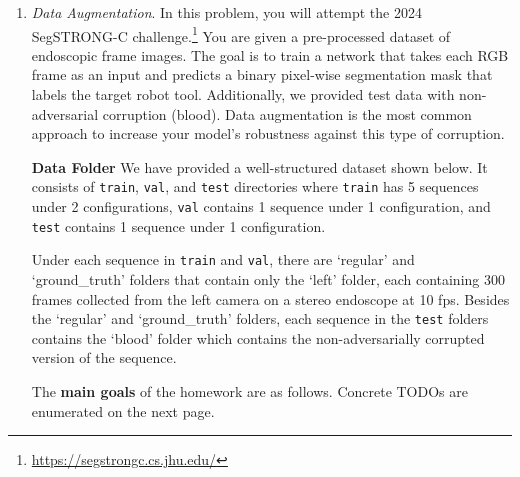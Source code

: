 \documentclass[a4paper]{article}
\begin{document}
	\begin{enumerate}
		\item \textit{Data Augmentation}. In this problem, you will attempt the 2024 SegSTRONG-C challenge.\footnote{\url{https://segstrongc.cs.jhu.edu/}} You are given a pre-processed dataset of endoscopic frame images. The goal is to train a network that takes each RGB frame as an input and predicts a binary pixel-wise segmentation mask that labels the target robot tool. Additionally, we provided test data with non-adversarial corruption (blood). Data augmentation is the most common approach to increase your model's robustness against this type of corruption.
		
		\textbf{Data Folder} 
		We have provided a well-structured dataset shown below. It consists of \texttt{train}, \texttt{val}, and \texttt{test} directories where \texttt{train} has 5 sequences under 2 configurations, \texttt{val} contains 1 sequence under 1 configuration, and \texttt{test} contains 1 sequence under 1 configuration. \\
        \begin{minipage}{\linewidth}
        \end{minipage}
        Under each sequence in \texttt{train} and \texttt{val}, there are `regular' and `ground\_truth' folders that contain only the `left' folder, each containing 300 frames collected from the left camera on a stereo endoscope at 10 fps. Besides the `regular' and `ground\_truth' folders, each sequence in the \texttt{test} folders contains the `blood' folder which contains the non-adversarially corrupted version of the sequence.
		
		The \textbf{main goals} of the homework are as follows. Concrete TODOs are enumerated on the next page.
		

\end{enumerate}
\end{document}
